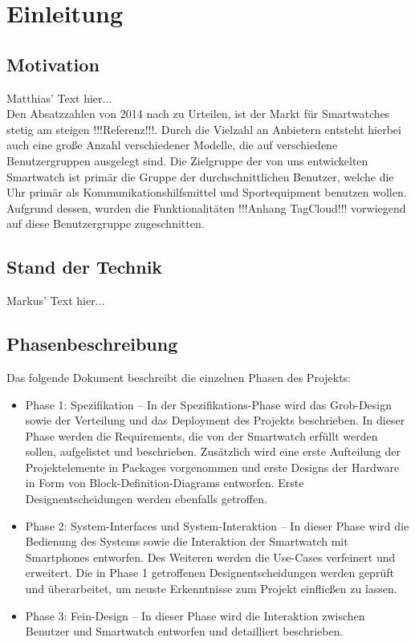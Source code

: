 \chapter{Einleitung}

\section{Motivation}
Matthias' Text hier...\\
Den Absatzzahlen von 2014 nach zu Urteilen, ist der Markt für Smartwatches stetig am steigen !!!Referenz!!!. Durch die Vielzahl an Anbietern entsteht hierbei auch eine große Anzahl verschiedener Modelle, die auf verschiedene Benutzergruppen ausgelegt sind. Die Zielgruppe der von uns entwickelten Smartwatch ist primär die Gruppe der durchschnittlichen Benutzer, welche die Uhr primär als Kommunikationshilfsmittel und Sportequipment benutzen wollen. Aufgrund dessen, wurden die Funktionalitäten !!!Anhang TagCloud!!! vorwiegend auf diese Benutzergruppe zugeschnitten.

\section{Stand der Technik}
Markus' Text hier...

\section{Phasenbeschreibung}
Das folgende Dokument beschreibt die einzelnen Phasen des Projekts:
\begin{itemize}
  \item Phase 1: Spezifikation -- In der Spezifikations-Phase wird das Grob-Design sowie der Verteilung und das Deployment des Projekts beschrieben. In dieser Phase werden die Requirements, die von der Smartwatch erfüllt werden sollen, aufgelistet und beschrieben. Zusätzlich wird eine erste Aufteilung der Projektelemente in Packages vorgenommen und erste Designs der Hardware in Form von Block-Definition-Diagrams entworfen. Erste Designentscheidungen werden ebenfalls getroffen.

  \item Phase 2: System-Interfaces und System-Interaktion -- In dieser Phase wird die Bedienung des Systems sowie die Interaktion der Smartwatch mit Smartphones entworfen. Des Weiteren werden die Use-Cases verfeinert und erweitert. Die in Phase 1 getroffenen Designentscheidungen werden geprüft und überarbeitet, um neuste Erkenntnisse zum Projekt einfließen zu lassen.

  \item Phase 3: Fein-Design -- In dieser Phase wird die Interaktion zwischen Benutzer und Smartwatch entworfen und detailliert beschrieben. 
\end{itemize}
